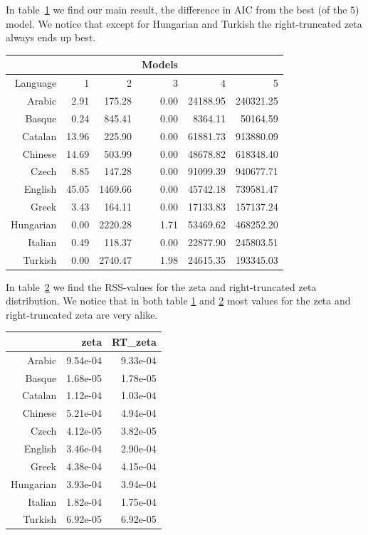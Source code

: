 \documentclass[paper=a4, fontsize=11pt]{scrartcl} %
\theoremstyle{plain}
\begin{document}
In table~\ref{diffAIC} we find our main result, the difference in AIC from the best (of the $5$) model. We notice that except for Hungarian and Turkish the right-truncated zeta always ends up best.
\begin{table}[htbp]
\centering
{} \label{diffAIC}
\begin{tabular}{rrrrrr}
 &&&Models&&\\
  \hline
 Language & 1 & 2 & 3 & 4 & 5 \\ 
  \hline
Arabic & 2.91 & 175.28 & 0.00 & 24188.95 & 240321.25 \\ 
  Basque & 0.24 & 845.41 & 0.00 & 8364.11 & 50164.59 \\ 
  Catalan & 13.96 & 225.90 & 0.00 & 61881.73 & 913880.09 \\ 
  Chinese & 14.69 & 503.99 & 0.00 & 48678.82 & 618348.40 \\ 
  Czech & 8.85 & 147.28 & 0.00 & 91099.39 & 940677.71 \\ 
  English & 45.05 & 1469.66 & 0.00 & 45742.18 & 739581.47 \\ 
  Greek & 3.43 & 164.11 & 0.00 & 17133.83 & 157137.24 \\ 
  Hungarian & 0.00 & 2220.28 & 1.71 & 53469.62 & 468252.20 \\ 
  Italian & 0.49 & 118.37 & 0.00 & 22877.90 & 245803.51 \\ 
  Turkish & 0.00 & 2740.47 & 1.98 & 24615.35 & 193345.03 \\ 
   \hline
\end{tabular}
\end{table}

In table~\ref{rss} we find the RSS-values for the zeta and right-truncated zeta distribution. We notice that in both table \ref{diffAIC} and \ref{rss} most values for the zeta and right-truncated zeta are very alike.

\begin{table}[ht]
\centering
{}\label{rss}
\begin{tabular}{rrr}
  \hline
 & zeta & RT\_zeta \\ 
  \hline
Arabic & 9.54e-04 & 9.33e-04 \\ 
  Basque & 1.68e-05 & 1.78e-05 \\ 
  Catalan & 1.12e-04 & 1.03e-04 \\ 
  Chinese & 5.21e-04 & 4.94e-04 \\ 
  Czech & 4.12e-05 & 3.82e-05 \\ 
  English & 3.46e-04 & 2.90e-04 \\ 
  Greek & 4.38e-04 & 4.15e-04 \\ 
  Hungarian & 3.93e-04 & 3.94e-04 \\ 
  Italian & 1.82e-04 & 1.75e-04 \\ 
  Turkish & 6.92e-05 & 6.92e-05 \\ 
   \hline
\end{tabular}
\end{table}
\end{document}
